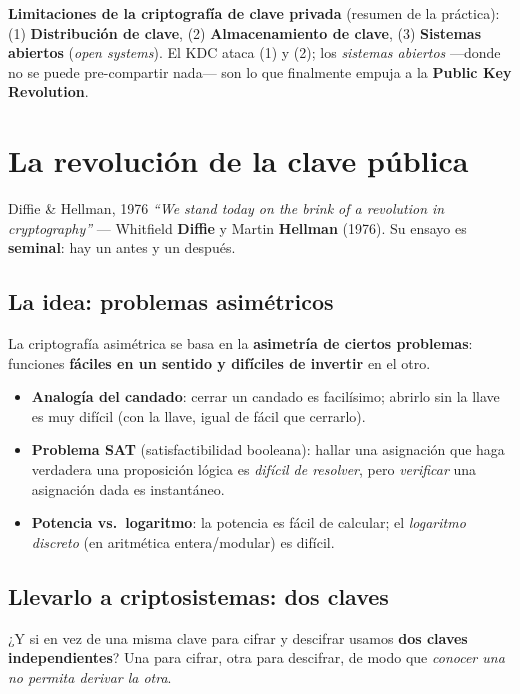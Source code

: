 \documentclass[11pt,a4paper]{article}
\begin{document}
\begin{slidebox}
\textbf{Limitaciones de la criptografía de clave privada} (resumen de la práctica):
(1) \textbf{Distribución de clave}, (2) \textbf{Almacenamiento de clave}, (3) \textbf{Sistemas
abiertos} (\emph{open systems}). El KDC ataca (1) y (2); los \emph{sistemas abiertos} —donde no
se puede pre-compartir nada— son lo que finalmente empuja a la \textbf{Public Key Revolution}.
\end{slidebox}

\section{La revolución de la clave pública}

\begin{defbox}{Diffie \& Hellman, 1976}
\emph{``We stand today on the brink of a revolution in cryptography''} — Whitfield
\textbf{Diffie} y Martin \textbf{Hellman} (1976). Su ensayo es \textbf{seminal}: hay un antes
y un después.
\end{defbox}

\subsection{La idea: problemas asimétricos}
La criptografía asimétrica se basa en la \textbf{asimetría de ciertos problemas}: funciones
\textbf{fáciles en un sentido y difíciles de invertir} en el otro.
\begin{itemize}[leftmargin=1.4em,itemsep=2pt]
  \item \textbf{Analogía del candado}: cerrar un candado es facilísimo; abrirlo sin la llave
        es muy difícil (con la llave, igual de fácil que cerrarlo).
  \item \textbf{Problema SAT} (satisfactibilidad booleana): hallar una asignación que haga
        verdadera una proposición lógica es \emph{difícil de resolver}, pero \emph{verificar}
        una asignación dada es instantáneo.
  \item \textbf{Potencia vs.\ logaritmo}: la potencia es fácil de calcular; el
        \emph{logaritmo discreto} (en aritmética entera/modular) es difícil.
\end{itemize}

\subsection{Llevarlo a criptosistemas: dos claves}
¿Y si en vez de una misma clave para cifrar y descifrar usamos \textbf{dos claves
independientes}? Una para cifrar, otra para descifrar, de modo que \emph{conocer una no permita
derivar la otra}.
\end{document}
